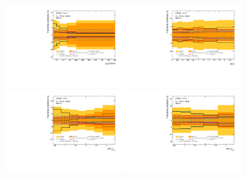 \FloatBarrier

\begin{figure}[ht]
  \centering
  \includegraphics[width=0.45\textwidth]{figures/diff_xsec/groupedimpact-absolute-xsec/tty_total_DL/Uncertainty_tty2l_pt_all_syst.pdf}%
  \includegraphics[width=0.45\textwidth]{figures/diff_xsec/groupedimpact-absolute-xsec/tty_total_DL/Uncertainty_tty2l_eta_all_syst.pdf}\\%
  \includegraphics[width=0.45\textwidth]{figures/diff_xsec/groupedimpact-absolute-xsec/tty_total_DL/Uncertainty_tty2l_dr_all_syst.pdf}%
  \includegraphics[width=0.45\textwidth]{figures/diff_xsec/groupedimpact-absolute-xsec/tty_total_DL/Uncertainty_tty2l_drphb_all_syst.pdf}\\%

\end{figure}
